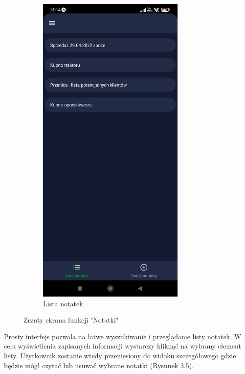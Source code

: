 \documentclass[a4paper,12pt,oneside]{book}
\begin{document}
\begin{figure}[H]
\begin{subfigure}{.5\textwidth}
			\includegraphics[width=0.8\textwidth]{grafika/notatki_b.jpg}
			\caption{Lista notatek}
		\end{subfigure}
		\caption{Zrzuty ekranu funkcji "Notatki"}
	\end{figure}
	
	Prosty interfejs pozwala na łatwe wyszukiwanie i przeglądanie listy notatek. W celu wyświetlenia zapisanych informacji wystarczy kliknąć na wybrany element listy. Użytkownik zostanie wtedy przeniesiony do widoku szczegółowego gdzie będzie mógł czytać lub usuwać wybrane notatki (Rysunek 3.5).
	
\end{document}
